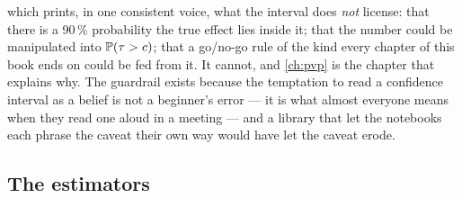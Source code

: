 which prints, in one consistent voice, what the interval does \emph{not} license: that there is a
90\,\% probability the true effect lies inside it; that the number could be manipulated into
$\operatorname{\mathbb{P}}(\tau > c)$; that a go/no-go rule of the kind every chapter of this book ends on could be fed
from it. It cannot, and \cref{ch:pvp} is the chapter that explains why. The guardrail exists because
the temptation to read a confidence interval as a belief is not a beginner's error --- it is what
almost everyone means when they read one aloud in a meeting --- and a library that let the
notebooks each phrase the caveat their own way would have let the caveat erode.

\subsection*{The estimators}

